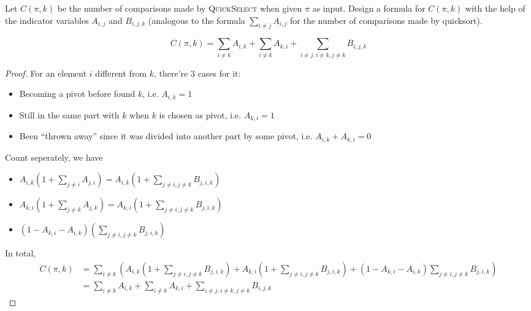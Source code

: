 \documentclass[11pt,a4paper,oneside]{article}
\begin{document}
\begin{problem}{7}
\statement
Let $C(\pi,k)$ be the number of comparisons made by \textsc{QuickSelect} when given
$\pi$ as input. Design a formula for $C(\pi,k)$ with the help of the indicator
variables $A_{i,j}$ and $B_{i,j,k}$ (analogous to the formula 
$\sum_{i \ne j} A_{i,j}$ for the number of comparisons made by quicksort).

\solution
\begin{lemma}
$$C(\pi,k)=\sum_{i \ne k} A_{i,k}+\sum_{i \ne k} A_{k,i}+\sum_{i \ne j,i \ne k,j\ne k} B_{i,j,k}$$
\end{lemma}
\begin{proof}

For an element $i$ different from $k$, there're $3$ cases for it:
\begin{itemize}
	\item Becoming a pivot before found $k$, i.e. $A_{i, k} = 1$
	\item Still in the same part with $k$ when $k$ is chosen as pivot, i.e. $A_{k, i} = 1$
	\item Been ``thrown away'' since it was divided into another part by some pivot, i.e. $A_{i, k} + A_{k, i} = 0$
\end{itemize}

Count seperately, we have
\begin{itemize}
	\item $A_{i, k} (1 + \sum_{j \neq i} A_{j, i}) = A_{i, k} (1 + \sum_{j \neq i, j \neq k} B_{j, i, k})$
	\item $A_{k, i} (1 + \sum_{j \neq k} A_{j, k}) = A_{k, i} (1 + \sum_{j \neq i, j \neq k} B_{j, i, k})$
	\item $(1 - A_{k, i} - A_{i, k})(\sum_{j \neq i, j \neq k} B_{j, i, k})$
\end{itemize}

In total,
\begin{align*}
	C(\pi,k) &= \sum_{i \neq k} (A_{i, k} (1 + \sum_{j \neq i, j \neq k} B_{j, i, k}) +A_{k, i} (1 + \sum_{j \neq i, j \neq k} B_{j, i, k}) +(1 - A_{k, i} - A_{i, k})\sum_{j \neq i, j \neq k} B_{j, i, k}) \\
	&= \sum_{i \ne k} A_{i,k}+\sum_{i \ne k} A_{k,i}+\sum_{i \ne j,i \ne k,j\ne k} B_{i,j,k}
\end{align*}

\end{proof}
\end{problem}
\end{document}
